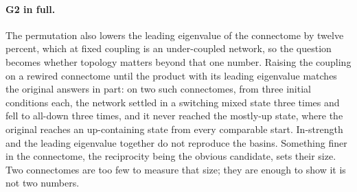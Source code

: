\documentclass[11pt]{article}
\theoremstyle{definition}\newtheorem{observation}{Observation}
\theoremstyle{remark}\newtheorem{remark}{Remark}
\begin{document}
\paragraph{G2 in full.} The permutation also lowers the leading eigenvalue of the connectome by twelve percent, which at fixed coupling is an under-coupled network, so the question becomes whether topology matters beyond that one number. Raising the coupling on a rewired connectome until the product with its leading eigenvalue matches the original answers in part: on two such connectomes, from three initial conditions each, the network settled in a switching mixed state three times and fell to all-down three times, and it never reached the mostly-up state, where the original reaches an up-containing state from every comparable start. In-strength and the leading eigenvalue together do not reproduce the basins. Something finer in the connectome, the reciprocity being the obvious candidate, sets their size. Two connectomes are too few to measure that size; they are enough to show it is not two numbers.
\end{document}
